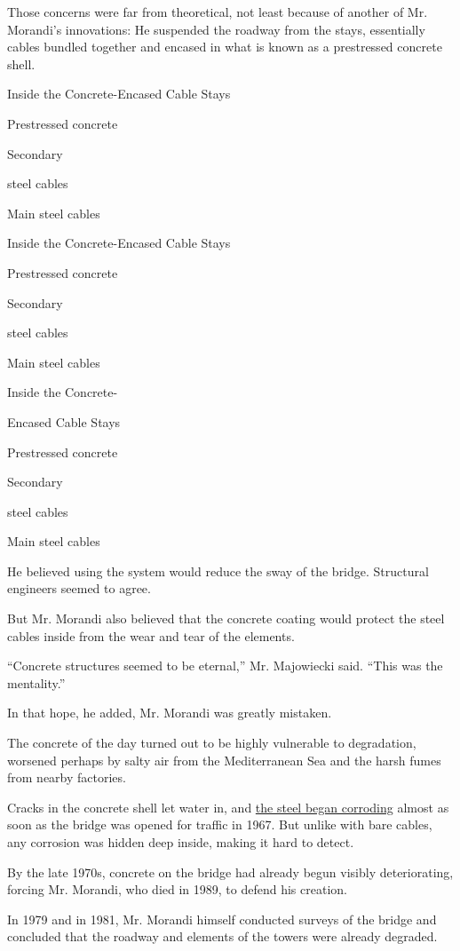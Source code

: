 Those concerns were far from theoretical, not least because of another
of Mr. Morandi's innovations: He suspended the roadway from the stays,
essentially cables bundled together and encased in what is known as a
prestressed concrete shell.

Inside the Concrete-Encased Cable Stays

Prestressed concrete

Secondary

steel cables

Main steel cables

Inside the Concrete-Encased Cable Stays

Prestressed concrete

Secondary

steel cables

Main steel cables

Inside the Concrete-

Encased Cable Stays

Prestressed concrete

Secondary

steel cables

Main steel cables

He believed using the system would reduce the sway of the bridge.
Structural engineers seemed to agree.

But Mr. Morandi also believed that the concrete coating would protect
the steel cables inside from the wear and tear of the elements.

``Concrete structures seemed to be eternal,'' Mr. Majowiecki said.
``This was the mentality.''

In that hope, he added, Mr. Morandi was greatly mistaken.

The concrete of the day turned out to be highly vulnerable to
degradation, worsened perhaps by salty air from the Mediterranean Sea
and the harsh fumes from nearby factories.

Cracks in the concrete shell let water in, and
\href{https://www.nytimes3xbfgragh.onion/2018/08/15/world/europe/italy-genoa-bridge-collapse.html}{the
steel began corroding} almost as soon as the bridge was opened for
traffic in 1967. But unlike with bare cables, any corrosion was hidden
deep inside, making it hard to detect.

By the late 1970s, concrete on the bridge had already begun visibly
deteriorating, forcing Mr. Morandi, who died in 1989, to defend his
creation.

In 1979 and in 1981, Mr. Morandi himself conducted surveys of the bridge
and concluded that the roadway and elements of the towers were already
degraded.

